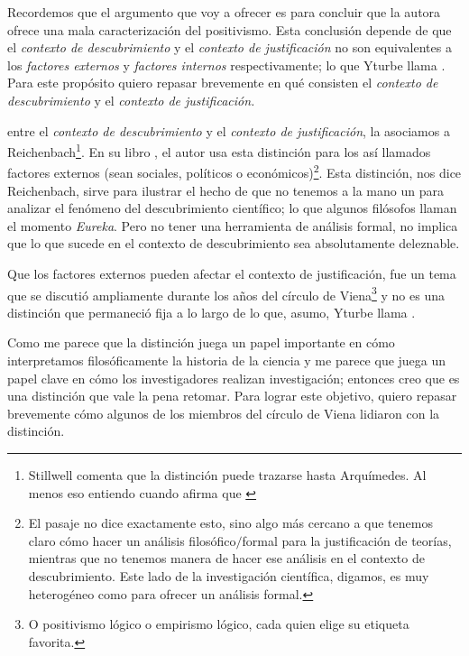 Recordemos que el argumento que voy a ofrecer es para concluir que la autora ofrece una mala caracterización del positivismo.
Esta conclusión depende de que el \emph{contexto de descubrimiento} y el \emph{contexto de justificación} no son equivalentes a los \emph{factores externos} y \emph{factores internos} respectivamente; lo que Yturbe llama .
Para este propósito quiero repasar brevemente en qué consisten el \emph{contexto de descubrimiento} y el \emph{contexto de justificación.}



 entre el \emph{contexto de descubrimiento} y el \emph{contexto de justificación}, la asociamos a Reichenbach\footnote{Stillwell comenta que la distinción puede trazarse hasta Arquímedes.
	Al menos eso entiendo cuando afirma que  \parencite[p. 56]{stillwell1989mathematics}}.
En su libro , el autor usa esta distinción para  los así llamados factores externos (sean sociales, políticos o económicos)\footnote{
	El pasaje no dice exactamente esto, sino algo más cercano a que tenemos claro cómo hacer un análisis filosófico$/$formal para la justificación de teorías, mientras que no tenemos manera de hacer ese análisis en el contexto de descubrimiento.
	Este lado de la investigación científica, digamos, es muy heterogéneo como para ofrecer un análisis formal.
	}.
Esta distinción, nos dice Reichenbach, sirve para ilustrar el hecho de que no tenemos a la mano un  para analizar el fenómeno del descubrimiento científico; lo que algunos filósofos \parencite{reichenbach1938experience, Seo2015} llaman el momento \emph{Eureka}.
Pero no tener una herramienta de análisis formal, no implica que lo que sucede en el contexto de descubrimiento sea absolutamente deleznable.

Que los factores externos pueden afectar el contexto de justificación, fue un tema que se discutió ampliamente durante los años del círculo de Viena\footnote{
	O positivismo lógico o empirismo lógico, cada quien elige su etiqueta favorita.
} y no es una distinción que permaneció fija a lo largo de lo que, asumo, Yturbe llama .

Como me parece que la distinción juega un papel importante en cómo interpretamos filosóficamente la historia de la ciencia y me parece que juega un papel clave en cómo los investigadores realizan investigación; entonces creo que es una distinción que vale la pena retomar.
Para lograr este objetivo, quiero repasar brevemente cómo algunos de los miembros del círculo de Viena lidiaron con la distinción.



